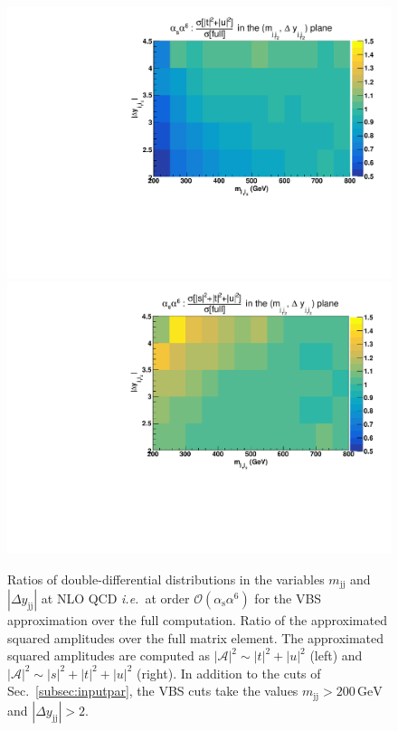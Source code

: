 \documentclass[twocolumn,epjc3]{svjour3} %
\newcommand{\Pj}{\ensuremath{\text{j}}\xspace}
\newcommand{\GeV}{\ensuremath{\,\text{GeV}}\xspace}
\newcommand{\alphas}{\ensuremath{\alpha_\text{s}}\xspace}
\begin{document}
    \begin{figure}[hbt]
    \centering
    {\includegraphics[scale=0.395]{figures/scanfigures/a6as_vbfnloVSrecola_tu.pdf}}
    {\includegraphics[scale=0.395]{figures/scanfigures/a6as_vbfnloVSrecola_stu.pdf}}
    \caption{Ratios of double-differential distributions in the variables $m_{\Pj\Pj}$ and $|\Delta y_{\Pj\Pj}|$ at NLO QCD \emph{i.e.}\ at order $\mathcal{O}(\alphas\alpha^6)$ for the VBS approximation over the full computation.
    Ratio of the approximated squared amplitudes over the full matrix element.
    The approximated squared amplitudes are computed as $|\mathcal{A}|^2 \sim |t|^2+|u|^2$ (left) and $|\mathcal{A}|^2 \sim |s|^2+|t|^2+|u|^2$ (right).
    In addition to the cuts of Sec.~\protect\ref{subsec:inputpar}, the VBS cuts take the values $m_{\Pj\Pj}>200 \GeV$ and $|\Delta y_{\Pj\Pj}|>2$.}
    \label{fig:ratio2d_NLO}
    \end{figure}
\end{document}
